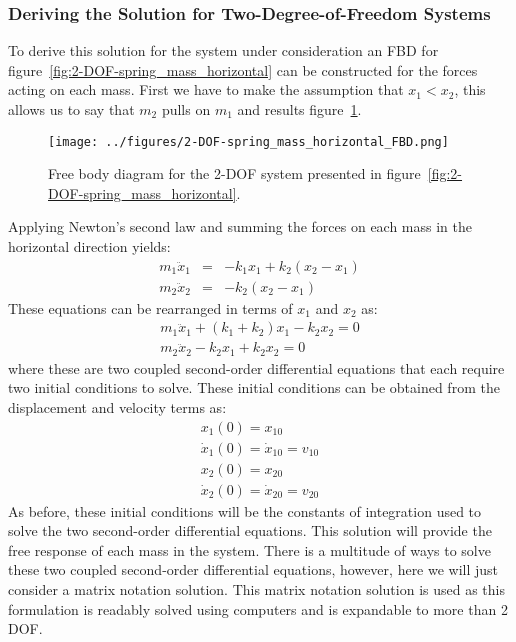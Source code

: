 \documentclass[12pt,letter]{article}
\begin{document}
	\subsubsection{Deriving the Solution for Two-Degree-of-Freedom Systems}
	\label{sec:2-DOF_derive_solution}
	To derive this solution for the system under consideration an FBD for figure~\ref{fig:2-DOF-spring_mass_horizontal} can be constructed for the forces acting on each mass. First we have to make the assumption that $x_1 < x_2$, this allows us to say that $m_2$ pulls on $m_1$ and results figure~\ref{fig:2-DOF-spring_mass_horizontal_FBD}.
	\begin{figure}[H]
		\centering
		\texttt{[image: ../figures/2-DOF-spring\_mass\_horizontal\_FBD.png]}
		\caption{Free body diagram for the 2-DOF system presented in figure~\ref{fig:2-DOF-spring_mass_horizontal}.}
		\label{fig:2-DOF-spring_mass_horizontal_FBD}
	\end{figure}
	\noindent Applying Newton's second law and summing the forces on each mass in the horizontal direction yields:
	\begin{eqnarray}
	m_1\ddot{x}_1 &= & -k_1x_1 + k_2(x_2-x_1) \\
	m_2\ddot{x}_2&= & -k_2(x_2-x_1)  \nonumber
	\end{eqnarray}
	These equations can be rearranged in terms of  $x_1$ and $x_2$ as:
	\begin{eqnarray}
	m_1\ddot{x}_1 +(k_1+k_2)x_1 -k_2x_2 =0 \\
	m_2\ddot{x}_2 - k_2x_1 + k_2x_2 = 0 \nonumber
	\end{eqnarray}
	where these are two coupled second-order differential equations that each require two initial conditions to solve. These initial conditions can be obtained from the displacement and velocity terms as:
	\begin{eqnarray}
	x_1(0) = x_{10} \\
	\dot{x}_1(0) = \dot{x}_{10} = v_{10} \nonumber \\ 
	x_2(0) = x_{20} \nonumber \\ 
	\dot{x}_2(0) = \dot{x}_{20} = v_{20} \nonumber
	\end{eqnarray}
	As before, these initial conditions will be the constants of integration used to solve the two second-order differential equations. This solution will provide the free response of each mass in the system. There is a multitude of ways to solve these two coupled second-order differential equations, however, here we will just consider a matrix notation solution. This matrix notation solution is used as this formulation is readably solved using computers and is expandable to more than 2 DOF.
	
\end{document}
